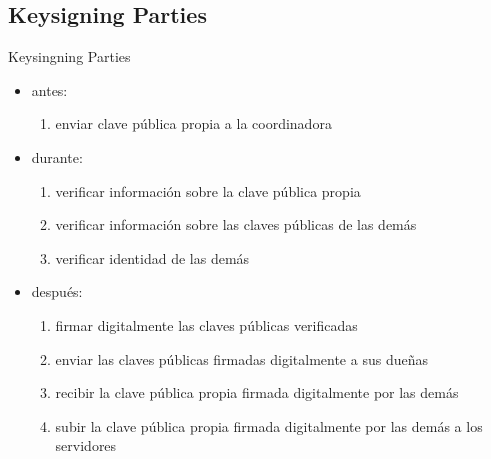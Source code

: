 \documentclass{beamer}
\begin{document}
\subsection{Keysigning Parties}
\begin{frame}[allowframebreaks]{Keysingning Parties}
\begin{itemize}
    \item antes:
        \begin{enumerate}
            \item enviar clave pública propia a la coordinadora
        \end{enumerate}
    \item durante:
        \begin{enumerate}
            \item verificar información sobre la clave pública propia
            \item verificar información sobre las claves públicas de las demás
            \item verificar identidad de las demás
        \end{enumerate}
    \item después:
        \begin{enumerate}
            \item firmar digitalmente las claves públicas verificadas
            \item enviar las claves públicas firmadas digitalmente a sus dueñas
            \item recibir la clave pública propia firmada digitalmente por las demás
            \item subir la clave pública propia firmada digitalmente por las
                demás a los servidores
        \end{enumerate}
\end{itemize}
\end{frame}
\end{document}
